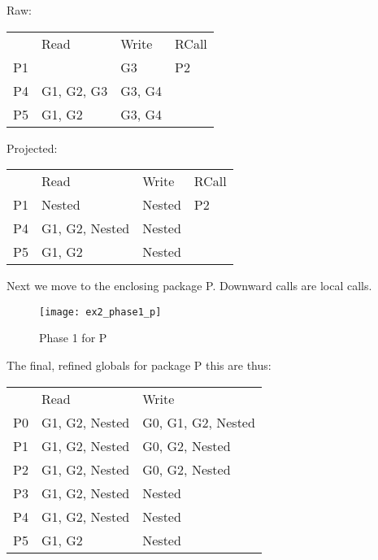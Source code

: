 \documentclass{article}
\begin{document}
\begin{center}
\begin{multicols}{2}
  Raw:\\
  \begin{tabular}{llll}
       & Read       & Write  & RCall \\
    P1 &            & G3     & P2    \\
    P4 & G1, G2, G3 & G3, G4 &       \\
    P5 & G1, G2     & G3, G4 &       \\
  \end{tabular}

  \columnbreak
  Projected:\\
  \begin{tabular}{|llll}
       & Read           & Write  & RCall \\
    P1 & Nested         & Nested & P2    \\
    P4 & G1, G2, Nested & Nested &       \\
    P5 & G1, G2         & Nested &       \\
  \end{tabular}
\end{multicols}
\end{center}

\pagebreak
\noindent
Next we move to the enclosing package P. Downward calls are local calls.

\begin{figure}[h]
  \begin{center}
    \texttt{[image: ex2\_phase1\_p]}
  \end{center}
  \caption{Phase 1 for P}
\end{figure}

\noindent
The final, refined globals for package P this are thus:

\begin{center}
  \begin{tabular}{lll}
       & Read           & Write              \\
    P0 & G1, G2, Nested & G0, G1, G2, Nested \\
    P1 & G1, G2, Nested & G0, G2, Nested     \\
    P2 & G1, G2, Nested & G0, G2, Nested     \\
    P3 & G1, G2, Nested & Nested             \\
    P4 & G1, G2, Nested & Nested             \\
    P5 & G1, G2         & Nested             \\
  \end{tabular}
\end{center}
\end{document}
